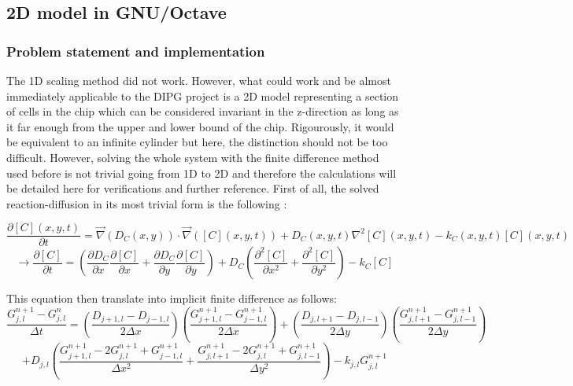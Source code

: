 \documentclass[11pt,a4paper]{article}
\begin{document}
\subsection{2D model in GNU/Octave}
\subsubsection{Problem statement and implementation}
The 1D scaling method did not work. However, what could work and be almost immediately applicable to the DIPG project is a 2D model representing a section of cells in the chip which can be considered invariant in the z-direction as long as it far enough from the upper and lower bound of the chip. Rigourously, it would be equivalent to an infinite cylinder but here, the distinction should not be too difficult. However, solving the whole system with the finite difference method used before is not trivial going from  1D to 2D and therefore the calculations will be detailed here for verifications and further reference. First of all, the solved reaction-diffusion in its most trivial form is the following : 

\[ \frac{\partial [C](x,y,t)}{\partial t} = \overrightarrow{\nabla}(D_C(x,y)) \cdot \overrightarrow{\nabla}( [C](x,y,t)) + D_C(x,y,t) \nabla^2 [C](x,y,t) -k_C(x,y,t)[C](x,y,t) \] 
\[\rightarrow \frac{\partial [C]}{\partial t} = (\frac{\partial D_C}{\partial x}\frac{\partial [C]}{\partial x} + \frac{\partial D_C}{\partial y}\frac{\partial [C]}{\partial y}) + D_C (\frac{\partial^2 [C]}{\partial x^2} + \frac{\partial^2 [C]}{\partial y^2}) -k_C[C] \] 

This equation then translate into implicit finite difference as follows: 
\[\frac{G^{n+1}_{j,l} - G^{n}_{j,l}}{\Delta t} = (\frac{D_{j+1,l} - D_{j-1,l}}{2 \Delta x})(\frac{G^{n+1}_{j+1,l} - G^{n+1}_{j-1,l}}{2 \Delta x}) + (\frac{D_{j,l+1} - D_{j,l-1}}{2 \Delta y}) ( \frac{G^{n+1}_{j,l+1} - G^{n+1}_{j,l-1}}{2 \Delta y})\] \[ + D_{j,l}(\frac{G^{n+1}_{j+1,l} - 2G^{n+1}_{j,l} + G^{n+1}_{j-1,l}}{\Delta x^2} + \frac{G^{n+1}_{j,l+1} - 2G^{n+1}_{j,l} + G^{n+1}_{j,l-1}}{\Delta y^2}) - k_{j,l} G^{n+1}_{j,l}\]
\end{document}
